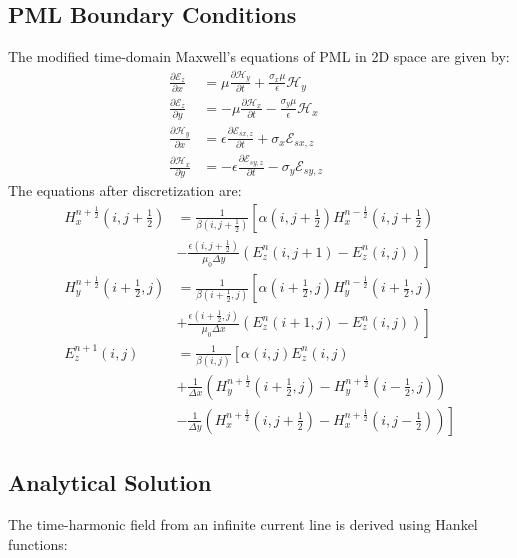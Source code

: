 \documentclass[journal]{IEEEtran}
\begin{document}
\subsection{PML Boundary Conditions}
The modified time-domain Maxwell’s equations of PML in 2D space are given by:
\begin{align}
\frac{\partial \mathcal{E}_z}{\partial x} &= \mu \frac{\partial \mathcal{H}_y}{\partial t} + \frac{\sigma_x \mu}{\epsilon} \mathcal{H}_y \qquad  \\
\frac{\partial \mathcal{E}_z}{\partial y} &= -\mu \frac{\partial \mathcal{H}_x}{\partial t} - \frac{\sigma_y \mu}{\epsilon} \mathcal{H}_x \qquad \\
\frac{\partial \mathcal{H}_y}{\partial x} &= \epsilon \frac{\partial \mathcal{E}_{sx,z}}{\partial t} + \sigma_x \mathcal{E}_{sx,z} \qquad  \\
\frac{\partial \mathcal{H}_x}{\partial y} &= -\epsilon \frac{\partial \mathcal{E}_{sy,z}}{\partial t} - \sigma_y \mathcal{E}_{sy,z} \qquad 
\end{align}
The equations after discretization are:
\begin{align}
H_x^{n+\frac{1}{2}}(i,j+\frac{1}{2}) &= \frac{1}{\beta(i,j+\frac{1}{2})}\left[\alpha(i,j+\frac{1}{2}) H_x^{n-\frac{1}{2}}(i,j+\frac{1}{2}) \right. \nonumber \\
&\left. - \frac{\epsilon(i,j+\frac{1}{2})}{\mu_0 \Delta y}\left(E_z^n(i,j+1) - E_z^n(i,j)\right)\right] \\
H_y^{n+\frac{1}{2}}(i+\frac{1}{2},j) &= \frac{1}{\beta(i+\frac{1}{2},j)}\left[\alpha(i+\frac{1}{2},j) H_y^{n-\frac{1}{2}}(i+\frac{1}{2},j) \right. \nonumber \\
&\left. + \frac{\epsilon(i+\frac{1}{2},j)}{\mu_0 \Delta x}\left(E_z^n(i+1,j) - E_z^n(i,j)\right)\right] \\
E_z^{n+1}(i,j) &= \frac{1}{\beta(i,j)}\left[\alpha(i,j) E_z^n(i,j) \right. \nonumber \\
&\left. + \frac{1}{\Delta x}\left(H_y^{n+\frac{1}{2}}(i+\frac{1}{2},j) - H_y^{n+\frac{1}{2}}(i-\frac{1}{2},j)\right) \right. \nonumber \\
&\left. - \frac{1}{\Delta y}\left(H_x^{n+\frac{1}{2}}(i,j+\frac{1}{2}) - H_x^{n+\frac{1}{2}}(i,j-\frac{1}{2})\right)\right]
\end{align}

\subsection{Analytical Solution}
The time-harmonic field from an infinite current line is derived using Hankel functions:
\end{document}

